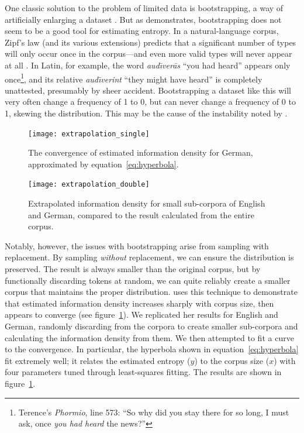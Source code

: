 \documentclass[12pt,twoside]{article}
\begin{document}
One classic solution to the problem of limited data is bootstrapping, a way of artificially enlarging a dataset \citep{oh,efron}. But as \citet[55-56]{oh} demonstrates, bootstrapping does not seem to be a good tool for estimating entropy. In a natural-language corpus, Zipf's law (and its various extensions) predicts that a significant number of types will only occur once in the corpus---and even more valid types will never appear at all \citep{davis}. In Latin, for example, the word \emph{aud\=\i{}ver\=as} ``you had heard'' appears only once\footnote{Terence's \emph{Phormio}, line 573: ``So why did you stay there for so long, I must ask, once \emph{you had heard} the news?''}, and its relative \emph{aud\=\i{}verint} ``they might have heard'' is completely unattested, presumably by sheer accident. Bootstrapping a dataset like this will very often change a frequency of 1 to 0, but can never change a frequency of 0 to 1, skewing the distribution. This may be the cause of the instability noted by \citet[56]{oh}.

\begin{figure}[p]
\centering
\caption{The convergence of estimated information density for German, approximated by equation~\ref{eq:hyperbola}.}
\label{fig:exsingle}
\noindent\texttt{[image: extrapolation\_single]}
\end{figure}

\begin{figure}[p]
\centering
\caption{Extrapolated information density for small sub-corpora of English and German, compared to the result calculated from the entire corpus.}
\label{fig:exdouble}
\noindent\texttt{[image: extrapolation\_double]}
\end{figure}

Notably, however, the issues with bootstrapping arise from sampling with replacement. By sampling \emph{without} replacement, we can ensure the distribution is preserved. The result is always smaller than the original corpus, but by functionally discarding tokens at random, we can quite reliably create a smaller corpus that maintains the proper distribution. \citet[57]{oh} uses this technique to demonstrate that estimated information density increases sharply with corpus size, then appears to converge (see figure~\ref{fig:exsingle}). We replicated her results for English and German, randomly discarding from the corpora to create smaller sub-corpora and calculating the information density from them. We then attempted to fit a curve to the convergence. In particular, the hyperbola shown in equation~\ref{eq:hyperbola} fit extremely well; it relates the estimated entropy (\(y\)) to the corpus size (\(x\)) with four parameters tuned through least-squares fitting. The results are shown in figure~\ref{fig:exsingle}.
\end{document}
